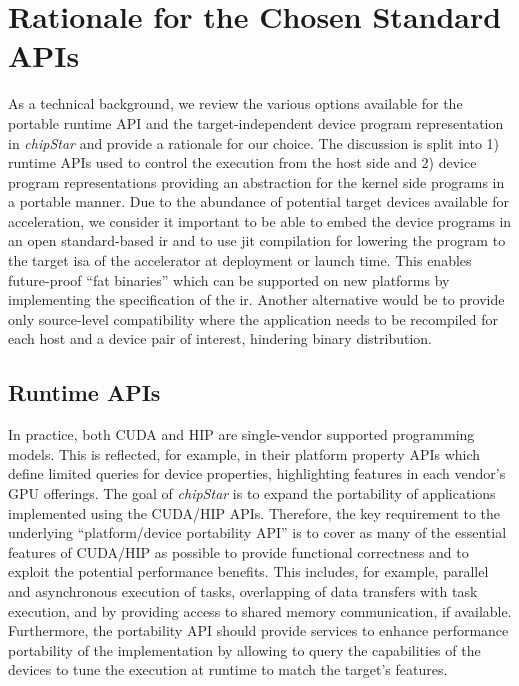 \documentclass[Afour,sageh,times]{sagej}
\newcommand{\chipstar}{\textit{chipStar}\xspace}
\begin{document}
\section{Rationale for the Chosen Standard APIs}
\label{section:portabilityAPIs}

As a technical background, we review the various options available for the portable runtime API and the target-independent device program representation in \chipstar and provide a rationale for our choice. The discussion is split into 1) runtime APIs used to control the execution from the host side and 2) device program representations providing an abstraction for the kernel side programs in a portable manner. Due to the abundance of potential target devices available for acceleration, we consider it important to be able to embed the device programs in an open standard-based \gls{ir} and to use \gls{jit} compilation for lowering the program to the target \gls{isa} of the accelerator at deployment or launch time. This enables future-proof ``fat binaries'' which can be supported on new platforms by implementing the specification of the \gls{ir}. Another alternative would be to provide only source-level
compatibility where the application needs to be recompiled for each host and a device pair of interest, hindering binary distribution.

\subsection{Runtime APIs}

In practice, both CUDA and HIP are single-vendor supported programming models.
This is reflected, for example, in their platform property APIs which define limited
queries for device properties, highlighting features in each vendor's
GPU offerings. The goal of \chipstar is to
expand the portability of applications implemented using the CUDA/HIP APIs.
Therefore, the key requirement to the underlying ``platform/device portability API'' is to
cover as many of the essential features of CUDA/HIP as possible to
provide functional correctness and to exploit the potential performance benefits.
This includes,
for example, parallel and asynchronous execution of tasks, overlapping of
data transfers with task execution, and by providing access to
shared memory communication, if available. Furthermore, the portability API
should provide services to enhance performance portability of
the implementation by allowing to query the capabilities of the
devices to tune the execution at runtime to match the target's features.
\end{document}
